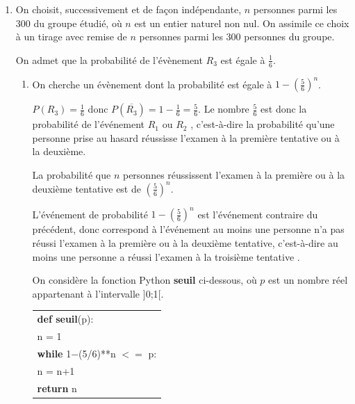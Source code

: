 \documentclass[10pt]{article}
\begin{document}
\begin{enumerate}
\begin{enumerate}
Cela veut dire que le nombre de passages pour réussir l'examen est en moyenne de $1,67$.		
	\end{enumerate}
\item On choisit, successivement et de façon indépendante, $n$ personnes parmi les 300 du groupe étudié, où $n$ est un entier naturel non nul. On assimile ce choix à un tirage avec remise de $n$ personnes parmi les 300 personnes du groupe.

On admet que la probabilité de l'évènement $R_3$ est égale à $\frac{1}{6}$.
	\begin{enumerate}
		\item  On cherche un évènement dont la probabilité est égale à $1-\left(\frac{5}{6}\right)^n$.

$P(R_3)=\frac{1}{6}$ donc $P\left (\overline{R_3} \right )=1-\frac{1}{6}=\frac{5}{6}$.
Le nombre $\frac{5}{6}$ est donc la probabilité de l'événement \og $R_1$ ou $R_2$ \fg{}, c'est-à-dire la probabilité qu'une personne prise au hasard réussisse l'examen à la première tentative ou à la deuxième.

La probabilité que $n$ personnes réussissent l'examen à la première ou à la deuxième tentative est de $\left (\frac{5}{6}\right )^n$.

L'événement de probabilité $1-\left (\frac{5}{6}\right )^n$ est l'événement contraire du précédent, donc correspond à l'événement \og au moins une personne n'a pas réussi l'examen  à la première ou à la deuxième tentative\fg{}, c'est-à-dire \og au moins une personne a réussi l'examen à la troisième tentative \fg{}.

 \bigskip
 
On considère la fonction Python \textbf{seuil} ci-dessous, où $p$ est un nombre réel appartenant à l'intervalle ]0;1[.
\begin{center}
\begin{tabular}[]{|l|}
\hline
\textbf{def seuil}(p):\\
\hspace{2em}n = 1\\
\hspace{2em}\textbf{while} 1$-$(5/6)**n $<=$ p:\\
\hspace{4.5em}n = n+1\\
\hspace{2em}\textbf{return} n\\
\hline
\end{tabular}
\end{center}


\end{enumerate}
\end{enumerate}
\end{document}
